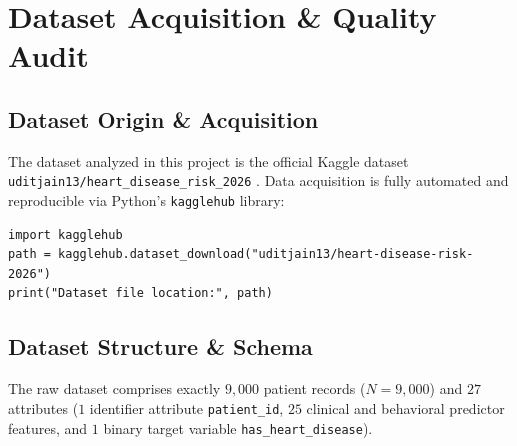 \chapter{Dataset Acquisition \& Quality Audit}

\section{Dataset Origin \& Acquisition}
The dataset analyzed in this project is the official Kaggle dataset \texttt{uditjain13/heart\_disease\_risk\_2026} \cite{kaggle2026}. Data acquisition is fully automated and reproducible via Python's \texttt{kagglehub} library:
\begin{verbatim}
import kagglehub
path = kagglehub.dataset_download("uditjain13/heart-disease-risk-2026")
print("Dataset file location:", path)
\end{verbatim}

\section{Dataset Structure \& Schema}
The raw dataset comprises exactly $9,000$ patient records ($N=9,000$) and $27$ attributes ($1$ identifier attribute \texttt{patient\_id}, $25$ clinical and behavioral predictor features, and $1$ binary target variable \texttt{has\_heart\_disease}).

